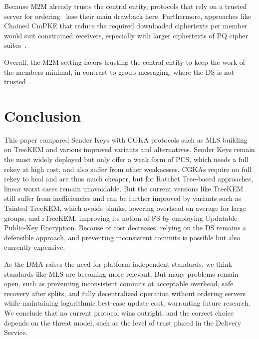 \documentclass[conference]{IEEEtran}
\begin{document}
Because \ac{M2M} already trusts the central entity, protocols that rely on a trusted server for ordering~\cite{beurdoucheMessagingLayerSecurity2025} lose their main drawback here.
Furthermore, approaches like Chained CmPKE that reduce the required downloaded ciphertexts per member would suit constrained receivers, especially with larger ciphertexts of \ac{PQ} cipher suites~\cite{hashimotoConcreteTreatmentEfficient2021}.

Overall, the \ac{M2M} setting favors trusting the central entity to keep the work of the members minimal, in contrast to group messaging, where the \ac{DS} is not trusted~\cite{beurdoucheMessagingLayerSecurity2025}.

\section{Conclusion}
This paper compared Sender Keys with \ac{CGKA} protocols such as \ac{MLS} building on TreeKEM and various improved variants and alternatives.
Sender Keys remain the most widely deployed but only offer a weak form of \ac{PCS}, which needs a full rekey at high cost, and also suffer from other weaknesses.
\acp{CGKA} require no full rekey to heal and are thus much cheaper, but for Ratchet Tree-based approaches, linear worst cases remain unavoidable.
But the current versions like TreeKEM still suffer from inefficiencies and can be further improved by variants such as Tainted TreeKEM, which avoids blanks, lowering overhead on average for large groups, and rTreeKEM, improving its notion of \ac{FS} by employing Updatable Public-Key Encryption.
Because of cost decreases, relying on the \ac{DS} remains a defensible approach, and preventing inconsistent commits is possible but also currently expensive.

As the \ac{DMA} raises the need for platform-independent standards, we think standards like \ac{MLS} are becoming more relevant.
But many problems remain open, such as preventing inconsistent commits at acceptable overhead, safe recovery after splits, and fully decentralized operation without ordering servers while maintaining logarithmic best-case update cost, warranting future research.
We conclude that no current protocol wins outright, and the correct choice depends on the threat model, such as the level of trust placed in the Delivery Service.

\balance



\end{document}
